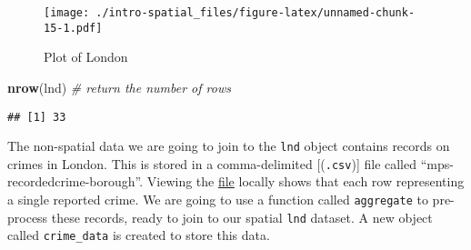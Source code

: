 \documentclass[]{article}
\newenvironment{Shaded}{}{}
\newcommand{\KeywordTok}[1]{\textcolor[rgb]{0.00,0.44,0.13}{\textbf{{#1}}}}
\newcommand{\DataTypeTok}[1]{\textcolor[rgb]{0.56,0.13,0.00}{{#1}}}
\newcommand{\DecValTok}[1]{\textcolor[rgb]{0.25,0.63,0.44}{{#1}}}
\newcommand{\StringTok}[1]{\textcolor[rgb]{0.25,0.44,0.63}{{#1}}}
\newcommand{\CommentTok}[1]{\textcolor[rgb]{0.38,0.63,0.69}{\textit{{#1}}}}
\newcommand{\NormalTok}[1]{{#1}}
\begin{document}
\begin{figure}[htbp]
\centering
\texttt{[image: ./intro-spatial\_files/figure-latex/unnamed-chunk-15-1.pdf]}
\caption{Plot of London}
\end{figure}

\begin{Shaded}
\begin{Highlighting}[]
\KeywordTok{nrow}\NormalTok{(lnd) }\CommentTok{# return the number of rows}
\end{Highlighting}
\end{Shaded}

\begin{verbatim}
## [1] 33
\end{verbatim}

The non-spatial data we are going to join to the \texttt{lnd} object
contains records on crimes in London. This is stored in a
comma-delimited {[}(\texttt{.csv}){]} file called
``mps-recordedcrime-borough''. Viewing the
\href{https://raw.githubusercontent.com/Robinlovelace/Creating-maps-in-R/master/data/mps-recordedcrime-borough.csv}{file}
locally shows that each row representing a single reported crime. We are
going to use a function called \texttt{aggregate} to pre-process these
records, ready to join to our spatial \texttt{lnd} dataset. A new object
called \texttt{crime\_data} is created to store this data.

\begin{Shaded}
\end{Shaded}
\end{document}
